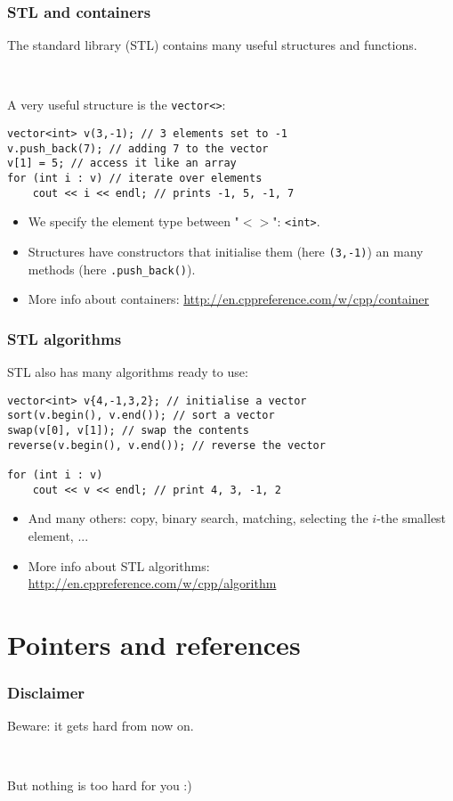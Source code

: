 \documentclass[12pt]{beamer}
\begin{document}
\begin{frame}[fragile]
\frametitle{STL and containers}
The standard library (STL) contains many useful structures and functions.

~

A very useful structure is the \lstinline|vector<>|:
\begin{lstlisting}
vector<int> v(3,-1); // 3 elements set to -1
v.push_back(7); // adding 7 to the vector
v[1] = 5; // access it like an array
for (int i : v) // iterate over elements
    cout << i << endl; // prints -1, 5, -1, 7
\end{lstlisting}
\begin{itemize}
\item We specify the element type between "$<>$": \lstinline|<int>|.
\item Structures have constructors that initialise them (here \lstinline|(3,-1)|) an many methods (here \lstinline|.push_back()|).
\item More info about containers: \url{http://en.cppreference.com/w/cpp/container}
\end{itemize}
\end{frame}

\begin{frame}[fragile]
\frametitle{STL algorithms}
STL also has many algorithms ready to use:
\begin{lstlisting}
vector<int> v{4,-1,3,2}; // initialise a vector
sort(v.begin(), v.end()); // sort a vector
swap(v[0], v[1]); // swap the contents
reverse(v.begin(), v.end()); // reverse the vector

for (int i : v)
    cout << v << endl; // print 4, 3, -1, 2
\end{lstlisting}
\begin{itemize}
\item And many others: copy, binary search, matching, selecting the $i$-the smallest element, ...
\item More info about STL algorithms: \url{http://en.cppreference.com/w/cpp/algorithm}
\end{itemize}
\end{frame}


\section{Pointers and references}

\begin{frame}
\frametitle{Disclaimer}
Beware: it gets hard from now on.

~

But nothing is too hard for you :)
\end{frame}
\end{document}
